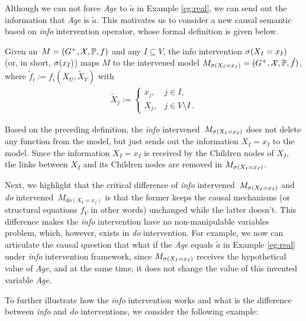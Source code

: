 Although we can not force \emph{Age} to $\tilde{a}$ in Example \ref{eg:real}, we can send out the information that \emph{Age} is $\tilde{a}$. This motivates us to consider a new causal semantic based on \emph{info} intervention operator, whose formal definition is given below. 

\begin{Def}
	\label{def:i-intervention}
	Given an \SCM\,$M=(G^+,\mathcal{X},\mathbb{P}, f)$ and any $I \subseteq V$, the info intervention $\mathrm{\sigma}(X_I=x_I)$ (or, in short, $\mathrm{\sigma}(x_I)$) maps $M$ to the intervened model $M_{\sigma(X_I = x_I)} = (G^+,\mathcal{X},\mathbb{P}, \tilde{f})$, 
	where $\tilde{f}_i := f_i(X_U, \tilde{X}_V)$ with
	$$
	\begin{aligned}
	\tilde{X}_j := \begin{cases}
	x_j, & j \in I, \\
	X_j, & j \in V \setminus I \,.
	\end{cases}
	\end{aligned}
	$$
\end{Def}

Based on the preceding definition, 	
the \emph{info} intervened \SCM\,$M_{\mathrm{\sigma}(X_I=x_I)}$ 
does not delete any function from the model, but just sends out the information 
$X_I = x_I$ to the model. Since the information $X_I=x_I$ is received by 
the Children nodes of $X_I$, the links between $X_I$ and its Children nodes 
are removed in $M_{\mathrm{\sigma}(X_I=x_I)}$.

Next, we highlight that the critical difference of 
 \emph{info} intervened \SCM\,$M_{\mathrm{\sigma}(X_I=x_I)}$ and 
\emph{do} intervened \SCM\,$M_{do(X_I=x_I)}$ is that the former  
keeps the causal mechanisms (or structural equations $f_{V}$ in other words) unchanged while the latter doesn't. 
This difference makes 
the \emph{info} intervention have no non-manipulable variables problem, which, however, exists 
in \emph{do} intervention. For example, we now can articulate 
the causal question that what if the \emph{Age} equals $\tilde{a}$ in Example \ref{eg:real} under \emph{info} intervention framework, since $M_{\mathrm{\sigma}(X_I=x_I)}$ receives the hypothetical value of \emph{Age}, and at the same time, it does not change the value of this invented variable \emph{Age}. 


To further illustrate how the \emph{info} intervention works and what is the difference between \emph{info} and \emph{do} interventions, we consider the following example: 




